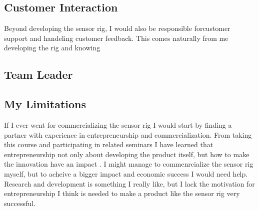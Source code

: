 \documentclass{iopconfser}
\begin{document}
\subsection*{Customer Interaction}

Beyond developing the sensor rig, I would also be responsible forcustomer support and handeling customer feedback.
This comes naturally from me developing the rig and knowing 

\subsection*{Team Leader}


\subsection*{My Limitations}

If I ever went for commercializing the sensor rig I would start by finding a partner with experience in entrepreneurship and commercialization.
From taking this course and participating in related seminars I have learned that entrepreneurship not only about developing the product itself, but how to make the innovation have an impact \cite{widdingWhatDoesIt2024}.
I might manage to commenrcialize the sensor rig myself, but to acheive a bigger impact and economic success I would need help.
Research and development is something I really like, but I lack the motivation for entrepreneurship I think is needed to make a product like the sensor rig very successful.






\printbibliography
\end{document}
